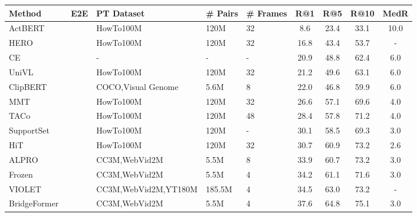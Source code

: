 \documentclass[10pt,twocolumn,letterpaper]{article}
\begin{document}
\begin{table*}[]
    \centering
    \small
        \begin{tabular}{ll|lll|cccc}
        \toprule
        \textbf{Method}       & \textbf{E2E} & \textbf{PT Dataset} & \textbf{\# Pairs}  & \textbf{\# Frames} & \textbf{R@1}    & \textbf{R@5}    & \textbf{R@10}    & \textbf{MedR}  \\ \midrule
        ActBERT ~\cite{actbert}    &   & HowTo100M & 120M  & 32  & 8.6  & 23.4                     & 33.1      & 10.0              \\
        HERO~\cite{hero}  &   & HowTo100M          & 120M     & 32  & 16.8 & 43.4                     & 53.7       & -              \\
        CE~\cite{ce}        &   & -     & -    &  -  & 20.9  & 48.8 & 62.4     & 6.0              \\
        UniVL~\cite{UniVL}        &   & HowTo100M     & 120M    &  32  & 21.2 & 49.6                     & 63.1       & 6.0              \\
        ClipBERT~\cite{clipbert}    &  & COCO,Visual Genome       & 5.6M   & 8    & 22.0 & 46.8             & 59.9     & 6.0               \\
        MMT ~\cite{mmt}       &   & HowTo100M          & 120M   &  32  & 26.6 & 57.1           & 69.6     & 4.0                \\
        TACo ~\cite{taco}        &   & HowTo100M   & 120M   &  48   & 28.4 & 57.8    & 71.2     & 4.0                \\
        SupportSet  ~\cite{support}        &   & HowTo100M          & 120M  &  -    & 30.1 & 58.5                     & 69.3     & 3.0                \\
        HiT  ~\cite{HiT}        &   & HowTo100M          & 120M    &  32 & 30.7 & 60.9  & 73.2     & 2.6                \\
        ALPRO  ~\cite{alpro}      &   & CC3M,WebVid2M       & 5.5M   &  8  & 33.9 & 60.7                     & 73.2   & 3.0                   \\
        Frozen~\cite{Frozen}       &  & CC3M,WebVid2M        & 5.5M   &  4   & 34.2 & 61.1       & 71.6           & 3.0 \\
        VIOLET~\cite{VIOLET}      &   & CC3M,WebVid2M,YT180M      & 185.5M   &  4  & 34.5 & 63.0                     & 73.2  & -                   \\
        BridgeFormer~\cite{BridgeFormer} &   & CC3M,WebVid2M        & 5.5M   &   4   & 37.6 & 64.8                     & 75.1     & 3.0                \\

\end{tabular}
\end{table*}
\end{document}
